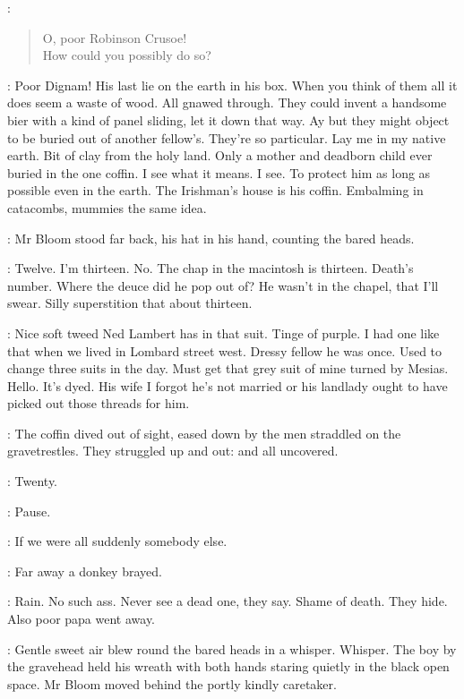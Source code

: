 :
\begin{verse}
    O, poor Robinson Crusoe! \\
    How could you possibly do so?
\end{verse}

\BloomInt:
Poor Dignam!
His last lie on the earth in his box.
When you think of them all
it does seem a waste of wood.
All gnawed through.
They could invent a handsome bier with a kind of panel sliding,
let it down that way.
Ay but they might object to be buried out of another fellow's.
They're so particular.
Lay me in my native earth.
Bit of clay from the holy land.
Only a mother and deadborn child ever buried in the one coffin.
I see what it means.
I see.
To protect him as long as possible even in the earth.
The Irishman's house is his coffin.
Embalming in catacombs, mummies the same idea.

:
Mr Bloom stood far back, his hat in his hand,
counting the bared heads.

\BloomInt:
Twelve.
I'm thirteen.
No.
The chap in the macintosh is thirteen.
Death's number.
Where the deuce did he pop out of?
He wasn't in the chapel, that I'll swear.
Silly superstition that about thirteen.

\BloomInt:
Nice soft tweed Ned Lambert has in that suit.
Tinge of purple.
I had one like that when we lived in Lombard street west.
Dressy fellow he was once.
Used to change three suits in the day.
Must get that grey suit of mine turned by Mesias.
Hello.
It's dyed.
His wife
I forgot he's not married
or his landlady ought to have picked out those threads for him.

:
The coffin dived out of sight,
eased down by the men straddled on the gravetrestles.
They struggled up and out:
and all uncovered.

\BloomInt:
Twenty.

:
Pause.

\BloomInt:
If we were all suddenly somebody else.

:
Far away a donkey brayed.

\BloomInt:
Rain.
No such ass.
Never see a dead one, they say.
Shame of death.
They hide.
Also poor papa went away.

:
Gentle sweet air blew round the bared heads in a whisper.
Whisper.
The boy by the gravehead held his wreath with both hands
staring quietly in the black open space.
Mr Bloom moved behind the portly kindly caretaker.

